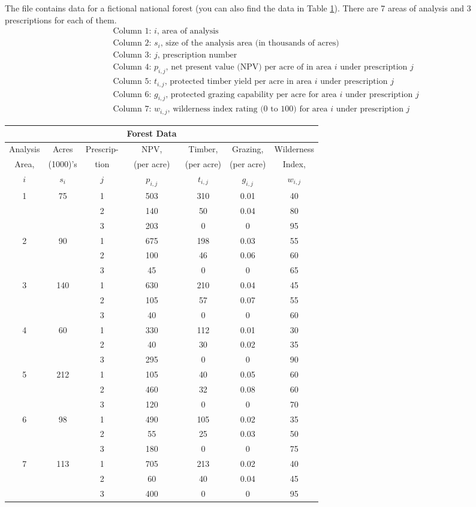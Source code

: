 The file  contains data for a fictional national forest (you can also find the data
in Table \ref{tab:forest}). There are 7 areas of analysis and 3 prescriptions for each of them. 
\begin{align*}
&\text{Column 1: $i$, area of analysis} \\
&\text{Column 2: $s_i$, size of the analysis area (in thousands of acres)} \\
&\text{Column 3: $j$, prescription number} \\
&\text{Column 4: $p_{i,j}$, net present value (NPV) per acre of in area $i$ under prescription $j$} \\
&\text{Column 5: $t_{i,j}$, protected timber yield per acre in area $i$ under prescription $j$} \\
&\text{Column 6: $g_{i,j}$, protected grazing capability per acre for area $i$ under prescription $j$} \\
&\text{Column 7: $w_{i,j}$, wilderness index rating (0 to 100) for area $i$ under prescription $j$}
\end{align*}
\begin{table}[h]
\centering
    \begin{tabular}{c c c c c c c}
&&&Forest Data&&& \\
\hline
Analysis & Acres &Prescrip-&NPV,&Timber,&Grazing,&Wilderness \\
Area,&(1000)'s &tion&(per acre) &(per acre)&(per acre)& Index,\\
$i$ &$s_i$&$j$& $p_{i,j}$ & $t_{i,j}$&$g_{i,j}$&$w_{i,j}$ \\\hline
1&	75	&1	&503	&310	&0.01&	40\\
&&		2&	140&	50&	0.04	&80\\
&&		3&	203&	0&	0&	95\\ \hline
2&	90&	1	&675&	198&	0.03&	55\\
&&		2&	100&	46&	0.06&	60\\
&&		3&	45&	0&	0&	65\\ \hline
3&	140&	1	&630&	210	&0.04&	45\\
&&		2&	105&	57&	0.07&	55\\
&&		3&	40	&0&	0&	60\\ \hline
4	&60&	1&	330&	112&	0.01&	30\\
&&		2	&40&	30&	0.02&	35\\
&&		3&	295&	0&	0	&90\\ \hline
5	&212&	1	&105	&40	&0.05&	60\\
&&		2	&460&	32	&0.08&	60\\
&& 3	&120&0&	0	&70\\ \hline
6	&98	&1	&490	&105	&0.02	&35\\
&&		2&	55	&25	&0.03	&50\\
&&		3	&180	&0	&0	&75\\ \hline
7&	113&	1	&705	&213&	0.02	&40\\
&&		2&	60	&40	&0.04&	45\\
&&		3	&400	&0	&0	&95\\
\hline
    \end{tabular}
\label{tab:forest}
\end{table}
